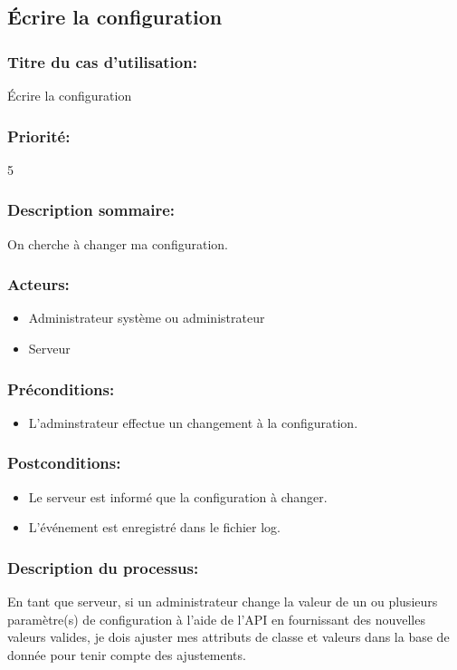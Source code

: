 \documentclass{scrreprt}
\begin{document}
\subsection{Écrire la configuration}
\subsubsection{Titre du cas d'utilisation:} Écrire la configuration
\subsubsection{Priorité:} 5
\subsubsection{Description sommaire:} On cherche à changer ma configuration.
\subsubsection{Acteurs:} 
\begin{itemize}
    \item Administrateur système ou administrateur
    \item Serveur
\end{itemize}
\subsubsection{Préconditions:}
\begin{itemize}
    \item L'adminstrateur effectue un changement à la configuration.
\end{itemize} 
\subsubsection{Postconditions:}
\begin{itemize}
    \item  Le serveur est informé que la configuration à changer.
    \item  L'événement est enregistré dans le fichier log.
\end{itemize} 
\subsubsection{Description du processus:}En tant que serveur, si un administrateur change la valeur de un ou plusieurs paramètre(s)
de configuration à l'aide de l'API en fournissant des nouvelles valeurs valides,
je dois ajuster mes attributs de classe et valeurs dans la base de donnée
pour tenir compte des ajustements.
\end{document}
